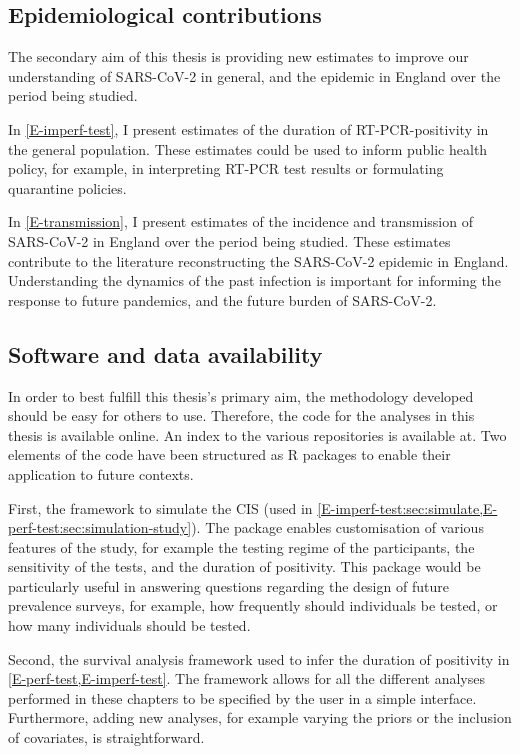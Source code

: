 \documentclass[thesis.tex]{subfiles}
\begin{document}
\subsection{Epidemiological contributions}

The secondary aim of this thesis is providing new estimates to improve our understanding of SARS-CoV-2 in general, and the epidemic in England over the period being studied.

In \cref{E-imperf-test}, I present estimates of the duration of RT-PCR-positivity in the general population.
These estimates could be used to inform public health policy, for example, in interpreting RT-PCR test results or formulating quarantine policies.

In \cref{E-transmission}, I present estimates of the incidence and transmission of SARS-CoV-2 in England over the period being studied.
These estimates contribute to the literature reconstructing the SARS-CoV-2 epidemic in England.
Understanding the dynamics of the past infection is important for informing the response to future pandemics, and the future burden of SARS-CoV-2.

\subsection{Software and data availability}

In order to best fulfill this thesis's primary aim, the methodology developed should be easy for others to use.
Therefore, the code for the analyses in this thesis is available online.
An index to the various repositories is available at.
Two elements of the code have been structured as R packages to enable their application to future contexts.

First, the framework to simulate the CIS (used in \cref{E-imperf-test:sec:simulate,E-perf-test:sec:simulation-study}).
The package enables customisation of various features of the study, for example the testing regime of the participants, the sensitivity of the tests, and the duration of positivity.
This package would be particularly useful in answering questions regarding the design of future prevalence surveys, for example, how frequently should individuals be tested, or how many individuals should be tested.

Second, the survival analysis framework used to infer the duration of positivity in \cref{E-perf-test,E-imperf-test}.
The framework allows for all the different analyses performed in these chapters to be specified by the user in a simple interface.
Furthermore, adding new analyses, for example varying the priors or the inclusion of covariates, is straightforward.
\end{document}
